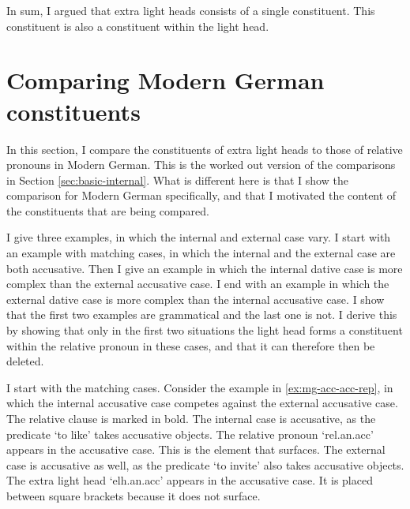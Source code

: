 In sum, I argued that extra light heads consists of a single constituent. This constituent is also a constituent within the light head.



\section{Comparing Modern German constituents}\label{sec:comparing-mg}

In this section, I compare the constituents of extra light heads to those of relative pronouns in Modern German. This is the worked out version of the comparisons in Section \ref{sec:basic-internal}. What is different here is that I show the comparison for Modern German specifically, and that I motivated the content of the constituents that are being compared.

I give three examples, in which the internal and external case vary.
I start with an example with matching cases, in which the internal and the external case are both accusative.
Then I give an example in which the internal dative case is more complex than the external accusative case.
I end with an example in which the external dative case is more complex than the internal accusative case.
I show that the first two examples are grammatical and the last one is not. I derive this by showing that only in the first two situations the light head forms a constituent within the relative pronoun in these cases, and that it can therefore then be deleted.

I start with the matching cases.
Consider the example in \ref{ex:mg-acc-acc-rep}, in which the internal accusative case competes against the external accusative case. The relative clause is marked in bold.
The internal case is accusative, as the predicate  `to like' takes accusative objects. The relative pronoun  `\ac{rel}.\ac{an}.\ac{acc}' appears in the accusative case. This is the element that surfaces.
The external case is accusative as well, as the predicate  `to invite' also takes accusative objects. The extra light head  `\ac{elh}.\ac{an}.\ac{acc}' appears in the accusative case. It is placed between square brackets because it does not surface.

